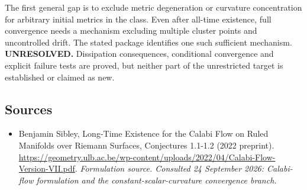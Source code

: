 \documentclass[11pt]{article}
\begin{document}
The first general gap is to exclude metric
degeneration or curvature concentration for
arbitrary initial metrics in the class.
Even after all-time existence, full
convergence needs a mechanism excluding
multiple cluster points and uncontrolled
drift. The stated package identifies one
such sufficient mechanism.
\textbf{UNRESOLVED.} Dissipation consequences,
conditional convergence and explicit
failure tests are proved, but neither
part of the unrestricted target is
established or claimed as new.

\subsection{Sources}
\begin{itemize}
\item[S1]Benjamin Sibley, Long-Time Existence for the Calabi Flow on Ruled Manifolds over Riemann Surfaces, Conjectures 1.1-1.2 (2022 preprint).
\url{https://geometry.ulb.ac.be/wp-content/uploads/2022/04/Calabi-Flow-Version-VII.pdf}.
\textit{Formulation source. Consulted 24 September 2026: Calabi-flow formulation and the constant-scalar-curvature convergence branch.}
\end{itemize}
\end{document}

